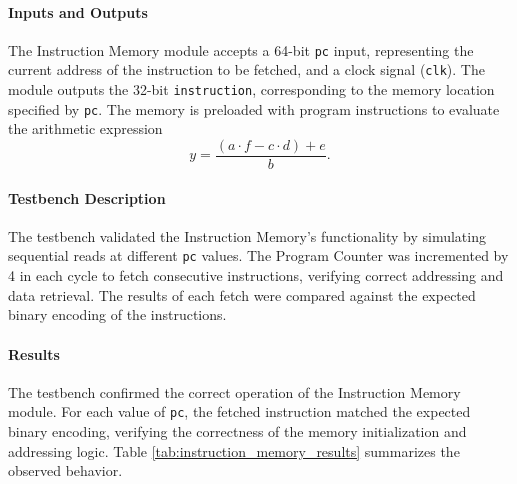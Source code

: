 \documentclass[12pt]{article}
\begin{document}
\paragraph{Inputs and Outputs}
The Instruction Memory module accepts a 64-bit \texttt{pc} input, representing the current address of the instruction to be fetched, and a clock signal (\texttt{clk}). The module outputs the 32-bit \texttt{instruction}, corresponding to the memory location specified by \texttt{pc}. The memory is preloaded with program instructions to evaluate  the arithmetic expression
\[
y = \frac{(a \cdot f - c \cdot d) + e}{b}.
\]

\paragraph{Testbench Description}
The testbench validated the Instruction Memory's functionality by simulating sequential reads at different \texttt{pc} values. The Program Counter was incremented by 4 in each cycle to fetch consecutive instructions, verifying correct addressing and data retrieval. The results of each fetch were compared against the expected binary encoding of the instructions.

\paragraph{Results}
The testbench confirmed the correct operation of the Instruction Memory module. For each value of \texttt{pc}, the fetched instruction matched the expected binary encoding, verifying the correctness of the memory initialization and addressing logic. Table \ref{tab:instruction_memory_results} summarizes the observed behavior.
\end{document}
